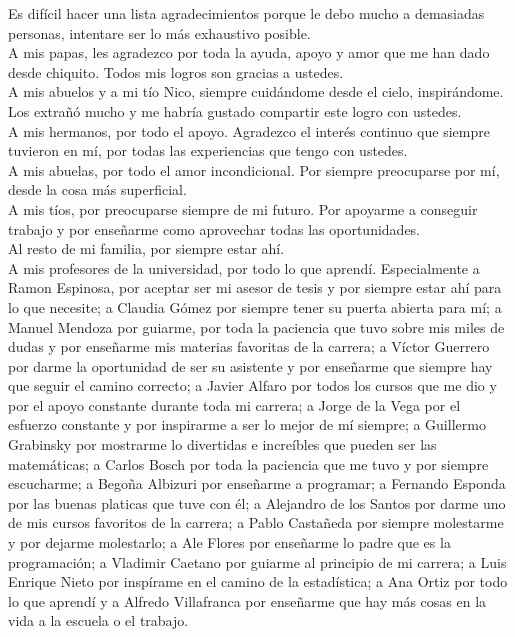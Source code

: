 \documentclass[11pt]{book}
\begin{document}
Es difícil hacer una lista agradecimientos porque le debo mucho a demasiadas personas, intentare ser lo más exhaustivo posible. \\
A mis papas, les agradezco por toda la ayuda, apoyo y amor que me han dado desde chiquito. Todos mis logros son gracias a ustedes. \\
A mis abuelos y a mi tío Nico, siempre cuidándome desde el cielo, inspirándome. Los extrañó mucho y me habría gustado compartir este logro con ustedes. \\
A mis hermanos, por todo el apoyo. Agradezco el interés continuo que siempre tuvieron en mí, por todas las experiencias que tengo con ustedes. \\
A mis abuelas, por todo el amor incondicional. Por siempre preocuparse por mí, desde la cosa más superficial. \\
A mis tíos, por preocuparse siempre de mi futuro. Por apoyarme a conseguir trabajo y por enseñarme como aprovechar todas las oportunidades. \\
Al resto de mi familia, por siempre estar ahí. \\ 
A mis profesores de la universidad, por todo lo que aprendí. Especialmente a Ramon Espinosa, por aceptar ser mi asesor de tesis y por siempre estar ahí para lo que necesite; a Claudia Gómez por siempre tener su puerta abierta para mí; a Manuel Mendoza por guiarme, por toda la paciencia que tuvo sobre mis miles de dudas y por enseñarme mis materias favoritas de la carrera; a Víctor Guerrero por darme la oportunidad de ser su asistente y por enseñarme que siempre hay que seguir el camino correcto; a Javier Alfaro por todos los cursos que me dio y por el apoyo constante durante toda mi carrera; a Jorge de la Vega por el esfuerzo constante y por inspirarme a ser lo mejor de mí siempre; a Guillermo Grabinsky por mostrarme lo divertidas e increíbles que pueden ser las matemáticas; a Carlos Bosch por toda la paciencia que me tuvo y por siempre escucharme; a Begoña Albizuri por enseñarme a programar; a Fernando Esponda por las buenas platicas que tuve con él; a Alejandro de los Santos por darme uno de mis cursos favoritos de la carrera; a Pablo Castañeda por siempre molestarme y por dejarme molestarlo; a Ale Flores por enseñarme lo padre que es la programación; a Vladimir Caetano por guiarme al principio de mi carrera; a Luis Enrique Nieto por inspírame en el camino de la estadística; a Ana Ortiz por todo lo que aprendí y a Alfredo Villafranca por enseñarme que hay más cosas en la vida a la escuela o el trabajo. \\
\end{document}
